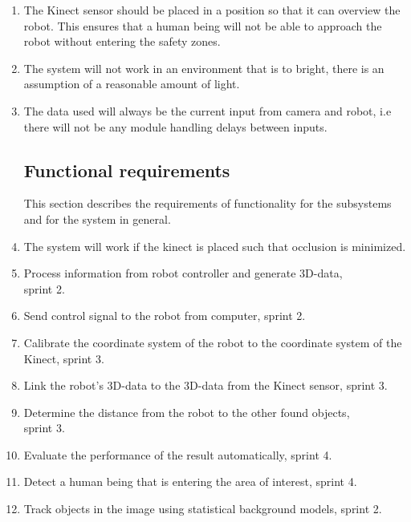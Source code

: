 \documentclass[10pt,a4paper]{article}
\begin{document}
\begin{enumerate}
\item The Kinect sensor should be placed in a position so that it can overview the robot. This ensures that a human being will not be able to approach the robot without entering the safety zones.

\item The system will not work in an environment that is to bright, there is an assumption of a reasonable amount of light.

\item The data used will always be the current input from camera and robot, i.e there will not be any module handling delays between inputs.

\subsection{Functional requirements}
This section describes the requirements of functionality for the subsystems and for the system in general.
\item The system will work if the kinect is placed such that occlusion is minimized. 
\item Process information from robot controller and generate 3D-data, \\sprint 2.
\item Send control signal to the robot from computer, sprint 2.
\item Calibrate the coordinate system of the robot to the coordinate system of the Kinect, sprint 3. 

\item Link the robot's 3D-data to the 3D-data from the Kinect sensor, sprint 3.

\item Determine the distance from the robot to the other found objects, \\sprint 3.

\item Evaluate the performance of the result automatically, sprint 4.

\item Detect a human being that is entering the area of interest, sprint 4.

\item Track objects in the image using statistical background models, sprint 2.

\end{enumerate}
\end{document}
